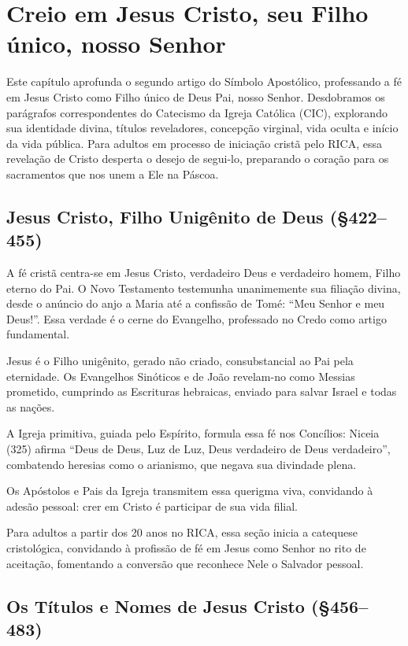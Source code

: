 \chapter{Creio em Jesus Cristo, seu Filho único, nosso Senhor}

Este capítulo aprofunda o segundo artigo do Símbolo Apostólico, professando a fé em Jesus Cristo como Filho único de Deus Pai, nosso Senhor. Desdobramos os parágrafos correspondentes do Catecismo da Igreja Católica (CIC), explorando sua identidade divina, títulos reveladores, concepção virginal, vida oculta e início da vida pública. Para adultos em processo de iniciação cristã pelo RICA, essa revelação de Cristo desperta o desejo de segui-lo, preparando o coração para os sacramentos que nos unem a Ele na Páscoa.

\section{Jesus Cristo, Filho Unigênito de Deus (\S 422--455)}

A fé cristã centra-se em Jesus Cristo, verdadeiro Deus e verdadeiro homem, Filho eterno do Pai. O Novo Testamento testemunha unanimemente sua filiação divina, desde o anúncio do anjo a Maria até a confissão de Tomé: ``Meu Senhor e meu Deus!''. Essa verdade é o cerne do Evangelho, professado no Credo como artigo fundamental.

Jesus é o Filho unigênito, gerado não criado, consubstancial ao Pai pela eternidade. Os Evangelhos Sinóticos e de João revelam-no como Messias prometido, cumprindo as Escrituras hebraicas, enviado para salvar Israel e todas as nações.

A Igreja primitiva, guiada pelo Espírito, formula essa fé nos Concílios: Niceia (325) afirma ``Deus de Deus, Luz de Luz, Deus verdadeiro de Deus verdadeiro'', combatendo heresias como o arianismo, que negava sua divindade plena.

Os Apóstolos e Pais da Igreja transmitem essa querigma viva, convidando à adesão pessoal: crer em Cristo é participar de sua vida filial.

Para adultos a partir dos 20 anos no RICA, essa seção inicia a catequese cristológica, convidando à profissão de fé em Jesus como Senhor no rito de aceitação, fomentando a conversão que reconhece Nele o Salvador pessoal.

\section{Os Títulos e Nomes de Jesus Cristo (\S 456--483)}

